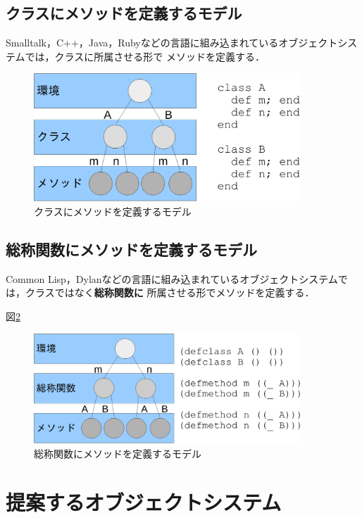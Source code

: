 \documentclass[a4paper,11pt,dvipdfmx]{jreport}
\begin{document}
\section{クラスにメソッドを定義するモデル}

Smalltalk，C++，Java，Rubyなどの言語に組み込まれているオブジェクトシステムでは，クラスに所属させる形で
メソッドを定義する．

\begin{figure}[htbp]
	\centering
	\includegraphics[width=10cm]{fig/trees_class-crop.pdf}
	\caption{クラスにメソッドを定義するモデル}
	\label{figure:class-model}
\end{figure}

\section{総称関数にメソッドを定義するモデル}

Common Lisp，Dylanなどの言語に組み込まれているオブジェクトシステムでは，クラスではなく\textbf{総称関数に}
所属させる形でメソッドを定義する．

図\ref{figure:gf-model}

\begin{figure}[htbp]
	\centering
	\includegraphics[width=10cm]{fig/trees_gf-crop.pdf}
	\caption{総称関数にメソッドを定義するモデル}
	\label{figure:gf-model}
\end{figure}

\chapter{提案するオブジェクトシステム}
\end{document}
